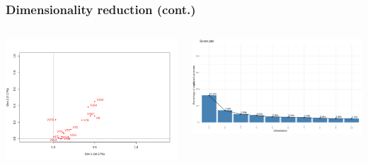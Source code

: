 \documentclass{beamer}
\begin{document}
\begin{frame}
	\frametitle{Dimensionality reduction (cont.)}
	\begin{columns}
		\begin{column}{0.55\textwidth}
			\begin{center}
				\includegraphics[width=\textwidth]{mca_corr.png}
			\end{center}
		\end{column}
		\begin{column}{0.45\textwidth}  %
			\begin{center}
				\begin{center}
					\includegraphics[width=\textwidth]{mca_scree.png}
				\end{center}
			\end{center}
		\end{column}
	\end{columns}
\end{frame}
\end{document}
